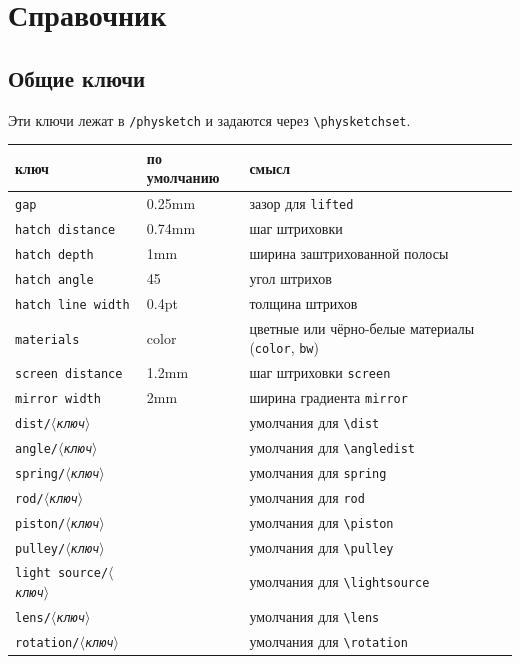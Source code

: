 \documentclass[a4paper,11pt]{article}
\newcommand\cs[1]{\texttt{\textbackslash#1}}
\newcommand\key[1]{\texttt{#1}}
\newcommand\meta[1]{\ensuremath{\langle}\textit{#1}\ensuremath{\rangle}}
\begin{document}
\section{Справочник}\label{sec:keys}
\subsection{Общие ключи}
Эти ключи лежат в \texttt{/physketch} и задаются через \cs{physketchset}.
\begin{center}
\begin{tabular}{lll}
  \toprule
  ключ & по умолчанию & смысл \\
  \midrule
  \key{gap} & 0.25mm & зазор для \key{lifted} \\
  \key{hatch distance} & 0.74mm & шаг штриховки \\
  \key{hatch depth} & 1mm & ширина заштрихованной полосы \\
  \key{hatch angle} & 45 & угол штрихов \\
  \key{hatch line width} & 0.4pt & толщина штрихов \\
  \key{materials} & color & цветные или чёрно-белые материалы (\texttt{color}, \texttt{bw}) \\
  \key{screen distance} & 1.2mm & шаг штриховки \key{screen} \\
  \key{mirror width} & 2mm & ширина градиента \key{mirror} \\
  \key{dist/\meta{ключ}} & & умолчания для \cs{dist} \\
  \key{angle/\meta{ключ}} & & умолчания для \cs{angledist} \\
  \key{spring/\meta{ключ}} & & умолчания для \key{spring} \\
  \key{rod/\meta{ключ}} & & умолчания для \key{rod} \\
  \key{piston/\meta{ключ}} & & умолчания для \cs{piston} \\
  \key{pulley/\meta{ключ}} & & умолчания для \cs{pulley} \\
  \key{light source/\meta{ключ}} & & умолчания для \cs{lightsource} \\
  \key{lens/\meta{ключ}} & & умолчания для \cs{lens} \\
  \key{rotation/\meta{ключ}} & & умолчания для \cs{rotation} \\
  \bottomrule
\end{tabular}
\end{center}
\end{document}
